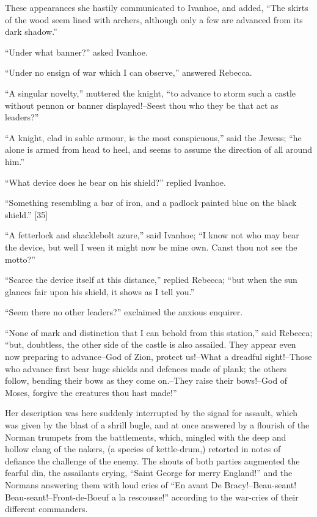 These appearances she hastily communicated to Ivanhoe, and added, ``The
skirts of the wood seem lined with archers, although only a few are
advanced from its dark shadow.''

``Under what banner?'' asked Ivanhoe.

``Under no ensign of war which I can observe,'' answered Rebecca.

``A singular novelty,'' muttered the knight, ``to advance to storm such
a castle without pennon or banner displayed!--Seest thou who they be
that act as leaders?''

``A knight, clad in sable armour, is the most conspicuous,'' said the
Jewess; ``he alone is armed from head to heel, and seems to assume the
direction of all around him.''

``What device does he bear on his shield?'' replied Ivanhoe.

``Something resembling a bar of iron, and a padlock painted blue on the
black shield.'' {[}35{]}

``A fetterlock and shacklebolt azure,'' said Ivanhoe; ``I know not who
may bear the device, but well I ween it might now be mine own. Canst
thou not see the motto?''

``Scarce the device itself at this distance,'' replied Rebecca; ``but
when the sun glances fair upon his shield, it shows as I tell you.''

``Seem there no other leaders?'' exclaimed the anxious enquirer.

``None of mark and distinction that I can behold from this station,''
said Rebecca; ``but, doubtless, the other side of the castle is also
assailed. They appear even now preparing to advance--God of Zion,
protect us!--What a dreadful sight!--Those who advance first bear huge
shields and defences made of plank; the others follow, bending their
bows as they come on.--They raise their bows!--God of Moses, forgive the
creatures thou hast made!''

Her description was here suddenly interrupted by the signal for assault,
which was given by the blast of a shrill bugle, and at once answered by
a flourish of the Norman trumpets from the battlements, which, mingled
with the deep and hollow clang of the nakers, (a species of
kettle-drum,) retorted in notes of defiance the challenge of the enemy.
The shouts of both parties augmented the fearful din, the assailants
crying, ``Saint George for merry England!'' and the Normans answering
them with loud cries of ``En avant De Bracy!--Beau-seant!
Beau-seant!--Front-de-Boeuf a la rescousse!'' according to the war-cries
of their different commanders.

